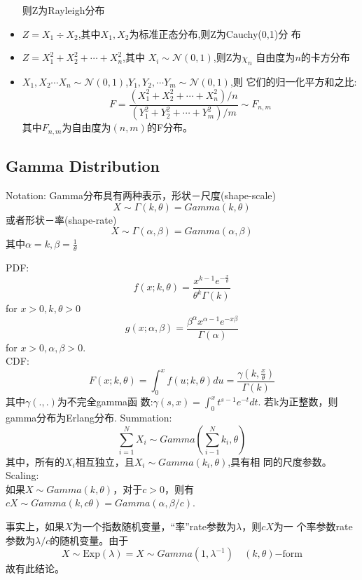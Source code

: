 \documentclass[fontset=none,oneside]{book}
\begin{document}
\begin{itemize}
  则Z为Rayleigh分布
\item $Z=X_{1}\div X_{2}$,其中$X_{1},X_{2}$为标准正态分布,则Z为Cauchy(0,1)分
  布
\item $Z=X_{1}^{2}+X_{2}^{2}+\cdots+X_{n}^{2}$,其中
  $X_{i}\sim\mathcal{N}(0,1)$,则Z为$\chi_{n}$ 自由度为$n$的卡方分布
\item $X_{1},X_{2}\cdots X_{n}\sim
  \mathcal{N}(0,1)$,$Y_{1},Y_{2},\cdots Y_{m}\sim \mathcal{N}(0,1)$,则
  它们的归一化平方和之比:
\begin{equation}
\label{eq:25}
F=\frac{(X_{1}^{2}+X_{2}^{2}+\cdots+X_{n}^{2})/n}{(Y_{1}^{2}+Y_{2}^{2}+\cdots+Y_{m}^{2})/m}\sim F_{n,m}
\end{equation}
其中$F_{n,m}$为自由度为$(n,m)$的F分布。
\end{itemize}
\subsection{Gamma Distribution}
\begin{shaded}
\noindent Notation: Gamma分布具有两种表示，形状－尺度(shape-scale)
\begin{equation}
\label{eq:29}
X\sim\Gamma(k,\theta)=Gamma(k,\theta)
\end{equation}
或者形状－率(shape-rate)
\begin{equation}
\label{eq:30}
X\sim\Gamma(\alpha,\beta)=Gamma(\alpha,\beta)
\end{equation}
其中$\alpha=k,\beta=\frac{1}{\theta}$
\end{shaded}
\noindent PDF:
\begin{equation}
\label{eq:26}
f(x;k,\theta)=\frac{x^{k-1}e^{-\frac{x}{\theta}}}{\theta^{k}\Gamma(k)}
\end{equation}
for $x>0,k,\theta>0$
\begin{equation}
\label{eq:31}
g(x;\alpha,\beta)=\frac{\beta^{\alpha}x^{\alpha-1}e^{-x\beta}}{\Gamma(\alpha)}
\end{equation}
for $x>0,\alpha,\beta>0$. \\
CDF:
\begin{equation}
\label{eq:27}
F(x;k,\theta)=\int_{0}^{x}f(u;k,\theta)du=\frac{\gamma(k,\frac{x}{\theta})}{\Gamma(k)}
\end{equation}
其中$\gamma(.,.)$为不完全gamma函
数:$\gamma(s,x)=\int_{0}^{x}t^{s-1}e^{-t}dt$.
若k为正整数，则gamma分布为Erlang分布.
Summation:
\begin{equation}
\label{eq:28}
\sum_{i=1}^{N}X_{i}\sim Gamma(\sum_{i-1}^{N}k_{i},\theta)
\end{equation}
其中，所有的$X_{i}$相互独立，且$X_{i}\sim Gamma(k_{i},\theta)$,具有相
同的尺度参数。 \\
Scaling:\\
如果$X\sim Gamma(k,\theta)$，对于$c>0$，则有$cX\sim Gamma(k,c\theta)=Gamma(\alpha,\beta/c)$.
\begin{shaded}
事实上，如果$X$为一个指数随机变量，“率”rate参数为$\lambda$，则$cX$为一
个率参数rate参数为$\lambda/c$的随机变量。由于
\begin{equation}
\label{eq:32}
X\sim\mathrm{Exp}(\lambda) =  X\sim Gamma(1,\lambda^{-1})
\quad (k,\theta)\mathrm{-form}
\end{equation}
故有此结论。
\end{shaded}
\end{document}
